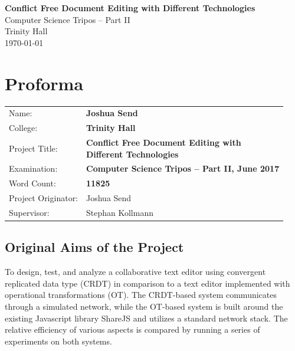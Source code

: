 \documentclass[12pt,a4paper,twoside,openright]{report}
\begin{document}

\thispagestyle{empty}



\vspace*{60mm}
\begin{center}
\Huge
\textbf{Conflict Free Document Editing with Different Technologies} \\[5mm]
Computer Science Tripos -- Part II \\[5mm]
Trinity Hall \\[5mm]
\today  %
\end{center}


\pagestyle{plain}

\chapter*{Proforma}

{\large
\begin{tabular}{ll}
Name:               & \bf Joshua Send                       \\
College:            & \bf Trinity Hall                     \\
Project Title:      & \makecell[tl]{\bf Conflict Free Document Editing with \\ \bf Different Technologies}\\
Examination:        & \bf Computer Science Tripos -- Part II, June 2017  \\
Word Count:         & \bf 11825			\\
Project Originator: & Joshua Send                    \\
Supervisor:         & Stephan Kollmann                    \\ 
\end{tabular}
}


\section*{Original Aims of the Project}

To design, test, and analyze a collaborative text editor using convergent replicated data type (CRDT) in comparison to a text editor implemented with operational transformations (OT). The CRDT-based system communicates through a simulated network, while the OT-based system is built around the existing Javascript library ShareJS and utilizes a standard network stack. The relative efficiency of various aspects is compared by running a series of experiments on both systems.
\end{document}
